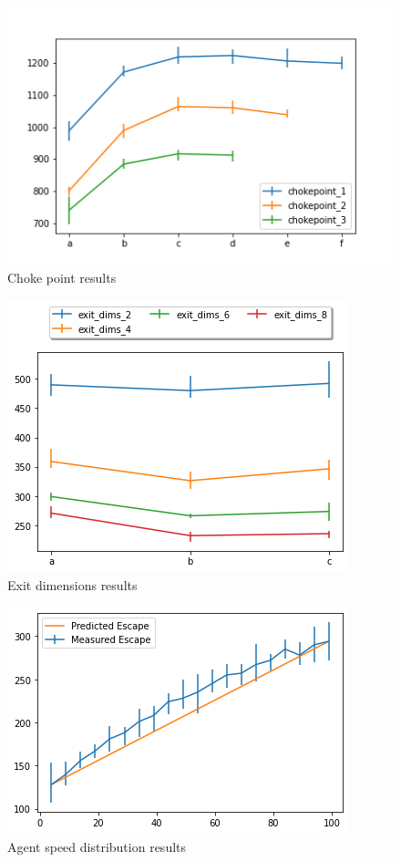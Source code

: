 \documentclass[12pt,letterpaper]{article}
\begin{document}
\begin{figure} [!ht]
  \centering
  \includegraphics[width=.9\linewidth]{./figures/chokepoint_graph.png}
  \caption{Choke point results}
  \label{fig:chokepointResults}
\end{figure}
\begin{figure} [!ht]
  \centering
  \includegraphics[width=.75\linewidth]{./figures/exit_dims_graph.png}
  \caption{Exit dimensions results}
  \label{fig:exitdimsResults}
\end{figure}

\begin{figure} [!ht]
  \centering
  \includegraphics[width=.75\linewidth]{./figures/speed_dist_test.png}
  \caption{Agent speed distribution results}
  \label{fig:speedResults}
\end{figure}
\end{document}
